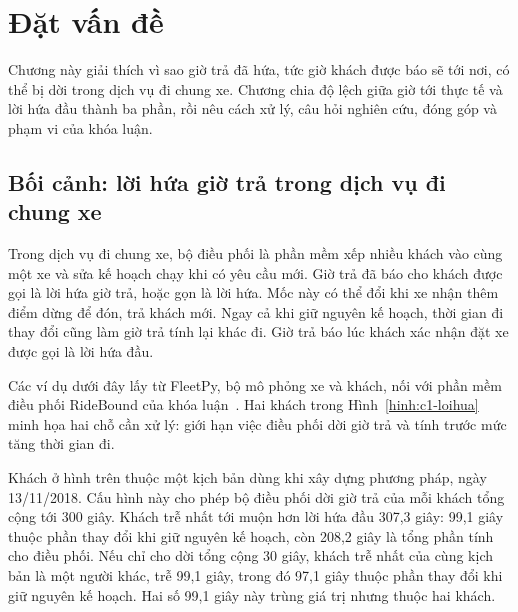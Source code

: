 \chapter{Đặt vấn đề}
\label{chuong:modau}

Chương này giải thích vì sao giờ trả đã hứa, tức giờ khách được báo sẽ tới nơi, có thể bị dời trong dịch vụ đi
chung xe. Chương chia độ lệch giữa giờ tới thực tế và lời hứa đầu thành ba phần, rồi nêu cách xử lý, câu hỏi
nghiên cứu, đóng góp và phạm vi của khóa luận.

\section{Bối cảnh: lời hứa giờ trả trong dịch vụ đi chung xe}
\label{muc:c1-boicanh}

Trong dịch vụ đi chung xe, bộ điều phối là phần mềm xếp nhiều khách vào cùng một xe và sửa kế hoạch chạy khi có
yêu cầu mới. Giờ trả đã báo cho khách được gọi là lời hứa giờ trả, hoặc gọn là lời hứa. Mốc này có thể đổi khi xe
nhận thêm điểm dừng để đón, trả khách mới. Ngay cả khi giữ nguyên kế hoạch, thời gian đi thay đổi cũng làm giờ
trả tính lại khác đi. Giờ trả báo lúc khách xác nhận đặt xe được gọi là lời hứa đầu.

Các ví dụ dưới đây lấy từ FleetPy, bộ mô phỏng xe và khách, nối với phần mềm điều phối RideBound của khóa
luận~\cite{engelhardt2026}. Hai khách trong Hình~\ref{hinh:c1-loihua} minh họa hai chỗ cần xử lý: giới hạn việc
điều phối dời giờ trả và tính trước mức tăng thời gian đi.

Khách ở hình trên thuộc một kịch bản dùng khi xây dựng phương pháp, ngày 13/11/2018. Cấu hình này cho phép bộ
điều phối dời giờ trả của mỗi khách tổng cộng tới 300 giây. Khách trễ nhất tới muộn hơn lời hứa đầu 307,3 giây:
99,1 giây thuộc phần thay đổi khi giữ nguyên kế hoạch, còn 208,2 giây là tổng phần tính cho điều phối.
Nếu chỉ cho dời tổng cộng 30 giây, khách trễ nhất của cùng kịch bản là một người khác, trễ 99,1 giây, trong đó
97,1 giây thuộc phần thay đổi khi giữ nguyên kế hoạch. Hai số 99,1 giây này trùng giá trị nhưng thuộc hai khách.

